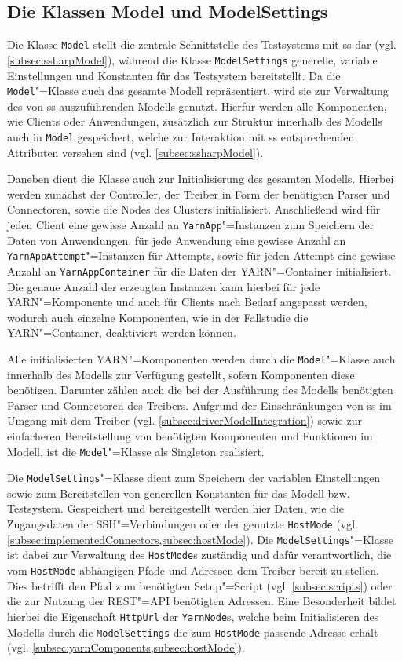 \subsection{Die Klassen Model und ModelSettings}
\label{subsec:modelClass}

Die Klasse \texttt{Model} stellt die zentrale Schnittstelle des Testsystems mit \gls{ss} dar (vgl. \cref{subsec:ssharpModel}), während die Klasse \texttt{ModelSettings} generelle, variable Einstellungen und Konstanten für das Testsystem bereitstellt.
Da die \texttt{Model}"=Klasse auch das gesamte Modell repräsentiert, wird sie zur Verwaltung des von \gls{ss} auszuführenden Modells genutzt.
Hierfür werden alle Komponenten, wie Clients oder Anwendungen, zusätzlich zur Struktur innerhalb des Modells auch in \texttt{Model} gespeichert, welche zur Interaktion mit \gls{ss} entsprechenden Attributen versehen sind (vgl. \cref{subsec:ssharpModel}).

Daneben dient die Klasse auch zur Initialisierung des gesamten Modells.
Hierbei werden zunächst der Controller, der Treiber in Form der benötigten Parser und Connectoren, sowie die Nodes des Clusters initialisiert.
Anschließend wird für jeden Client eine gewisse Anzahl an \texttt{YarnApp}"=Instanzen zum Speichern der Daten von Anwendungen, für jede Anwendung eine gewisse Anzahl an \texttt{YarnAppAttempt}"=Instanzen für Attempts, sowie für jeden Attempt eine gewisse Anzahl an \texttt{YarnAppContainer} für die Daten der YARN"=Container initialisiert.
Die genaue Anzahl der erzeugten Instanzen kann hierbei für jede YARN"=Komponente und auch für Clients nach Bedarf angepasst werden, wodurch auch einzelne Komponenten, wie \zB in der Fallstudie die YARN"=Container, deaktiviert werden können.

Alle initialisierten YARN"=Komponenten werden durch die \texttt{Model}"=Klasse auch innerhalb des Modells zur Verfügung gestellt, sofern Komponenten diese benötigen.
Darunter zählen auch die bei der Ausführung des Modells benötigten Parser und Connectoren des Treibers.
Aufgrund der Einschränkungen von \gls{ss} im Umgang mit dem Treiber (vgl. \cref{subsec:driverModelIntegration}) sowie zur einfacheren Bereitstellung von benötigten Komponenten und Funktionen im Modell, ist die \texttt{Model}"=Klasse als Singleton realisiert.

Die \texttt{ModelSettings}"=Klasse dient zum Speichern der variablen Einstellungen sowie zum Bereitstellen von generellen Konstanten für das Modell bzw. Testsystem.
Gespeichert und bereitgestellt werden hier Daten, wie \zB die Zugangsdaten der SSH"=Verbindungen oder der genutzte \texttt{HostMode} (vgl.  \cref{subsec:implementedConnectors,subsec:hostMode}).
Die \texttt{ModelSettings}"=Klasse ist dabei zur Verwaltung des \texttt{HostMode}s zuständig und dafür verantwortlich, die vom \texttt{HostMode} abhängigen Pfade und Adressen dem Treiber bereit zu stellen.
Dies betrifft \zB den Pfad zum benötigten Setup"=Script (vgl. \cref{subsec:scripts}) oder die zur Nutzung der REST"=API benötigten Adressen.
Eine Besonderheit bildet hierbei die Eigenschaft \texttt{HttpUrl} der \texttt{YarnNode}s, welche beim Initialisieren des Modells durch die \texttt{ModelSettings} die zum \texttt{HostMode} passende Adresse erhält (vgl. \cref{subsec:yarnComponents,subsec:hostMode}).

